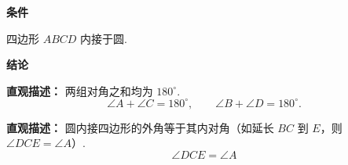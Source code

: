 \begin{statementbox}
	\textbf{\textcolor{CStatement}{条件}}
	\begin{description}[style=nextline, leftmargin=2.8em, labelsep=0.5em, itemsep=0.35em]
		\item[\textbf{\textcolor{CStatement}{条件1（共圆条件）：}}] 四边形 $ABCD$ 内接于圆.
	\end{description}

	\textbf{\textcolor{CStatement}{结论}}
	\begin{description}[style=nextline, leftmargin=2.8em, labelsep=0.5em, itemsep=0.45em]
		\item[\textbf{\textcolor{CStatement}{结论一（对角互补）：}}]
			\textbf{\textcolor{CStatement}{直观描述：}}
			两组对角之和均为 $180^\circ$.
			\[
				\angle A + \angle C = 180^\circ,
				\qquad
				\angle B + \angle D = 180^\circ.
			\]

		\item[\textbf{\textcolor{CStatement}{推广结论（外角定理）：}}]
			\textbf{\textcolor{CStatement}{直观描述：}}
			圆内接四边形的外角等于其内对角（如延长 $BC$ 到 $E$，则 $\angle DCE = \angle A$）.
			\[
				\angle DCE = \angle A
			\]
	\end{description}
\end{statementbox}
